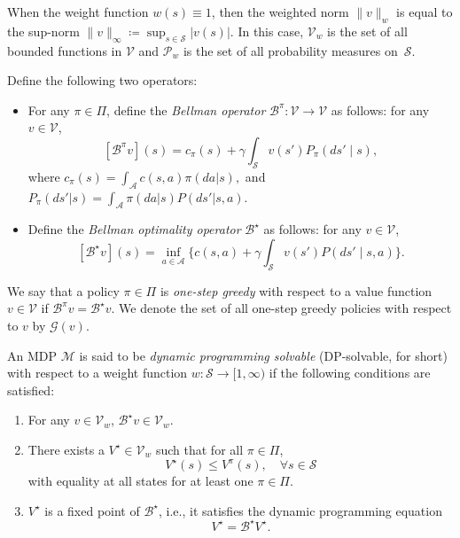 \documentclass[letterpaper, 10pt]{IEEEtran}
\newcommand*\ALPHABET{\mathcal}
\newcommand*\BELLMAN{\mathscr{B}}
\begin{document}
\begin{remark}\label{rem:sup-norm}
When the weight function $w(s) \equiv 1$, then the weighted norm $\| v \|_w$ is equal to the sup-norm $\| v \|_\infty \coloneqq \sup_{s \in \ALPHABET S} | v(s)|$. In this case, $\ALPHABET V_w$ is the set of all  bounded functions in $\ALPHABET V$ and $\ALPHABET P_w$ is the set of all probability measures on~$\ALPHABET S$. 
\end{remark}

\begin{definition}
Define the following two operators:
\begin{itemize}
  \item For any $\pi \in \Pi$, define the \emph{Bellman operator} 
    $\BELLMAN^\pi \colon \ALPHABET V \to \ALPHABET V$ as follows: for any $v
    \in \ALPHABET V$, 
    \[
        [ \BELLMAN^\pi v](s) =
        c_\pi(s) + \gamma
        \int_{\ALPHABET S} v(s') P_\pi(ds'\mid s),
     \]
   where $c_\pi(s) = \int_{\ALPHABET A} c(s,a) \pi(da | s),$ and 
   $P_\pi(ds' | s) = \int_{\ALPHABET A} \pi(da | s) P(ds' | s,a)$.

   \item Define the \emph{Bellman optimality operator} 
   $\BELLMAN^\star$ as follows: for any $v \in \ALPHABET V$,
    \[
        [ \BELLMAN^\star v](s) =
        \inf_{a \in \ALPHABET A} \biggl\{c(s,a) + \gamma
        \int_{\ALPHABET S} v(s') P(ds'\mid s,a) \biggr\}.
     \]
\end{itemize}
\end{definition}
\begin{definition}
We say that a policy $\pi \in \Pi$ is \emph{one-step greedy} with respect to a value function $v \in \ALPHABET V$ if $\BELLMAN^{\pi} v = \BELLMAN^{\star} v$. We denote  the set of all one-step greedy policies with respect to $v$ by $\ALPHABET G(v)$.
\end{definition}

\begin{definition}
  An MDP $\ALPHABET M$ is said to be \emph{dynamic programming solvable}
  (DP-solvable, for short) with respect to a weight function $w \colon \ALPHABET S \to [1, \infty)$ if the following conditions are satisfied:
  \begin{enumerate}
    \item 
    For any $v \in \ALPHABET V_w$, $\BELLMAN^\star v \in \ALPHABET V_w$.
   \item There exists a $V^\star \in \ALPHABET V_w$ such that for all $\pi \in \Pi$,
   \[
       V^\star(s) \le V^{\pi}(s),
       \quad \forall s \in \ALPHABET S
   \]
   with equality at all states for at least one $\pi \in \Pi$.
  \item  $V^\star$ is a fixed point of $\BELLMAN^\star$, i.e., it satisfies the dynamic programming equation
      \[
        V^{\star} = \BELLMAN^\star V^{\star}.
       \]
  \end{enumerate}
\end{definition}
\end{document}
